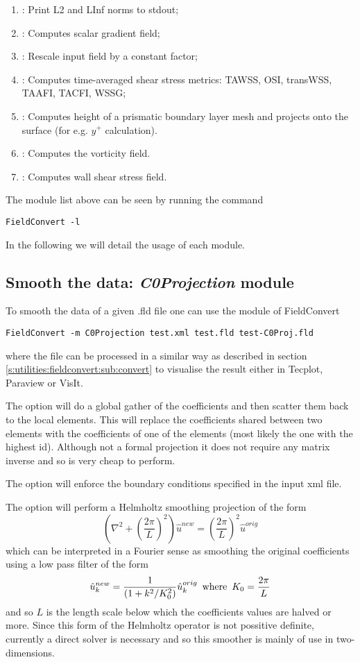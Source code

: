 \begin{enumerate}
\item {}: Print L2 and LInf norms to stdout;
\item {}: Computes scalar gradient field;
\item {}: Rescale input field by a constant factor;
\item {}: Computes time-averaged shear stress metrics: TAWSS, OSI, transWSS, TAAFI, TACFI, WSSG;
\item {}: Computes height of a prismatic boundary layer mesh and projects onto the surface (for e.g. $y^+$ calculation).
\item {}: Computes the vorticity field.
\item {}: Computes wall shear stress field.
\end{enumerate}
The module list above can be seen by running the command
%
\begin{lstlisting}[style=BashInputStyle]
FieldConvert -l
\end{lstlisting}
%
In the following we will detail the usage of each module.
%
%
%

\subsection{Smooth the data: \textit{C0Projection} module}
To smooth the data of a given .fld file one can
use the  module of FieldConvert
%
\begin{lstlisting}[style=BashInputStyle]
FieldConvert -m C0Projection test.xml test.fld test-C0Proj.fld
\end{lstlisting}
%
where the file  can be processed in a similar
way as described in section \ref{s:utilities:fieldconvert:sub:convert}
to visualise the result either in Tecplot, Paraview or VisIt.

The option  will do a global gather of the
coefficients and then scatter them back to the local elements. This
will replace the coefficients shared between two elements with the
coefficients of one of the elements (most likely the one with the
highest id). Although not a formal projection it does not require any
matrix inverse and so is very cheap to perform.

The option  will enforce the boundary conditions
specified in the input xml file.

The option  will perform a Helmholtz
smoothing projection of the form
\[
\left (\nabla^2 + \left (\frac{2 \pi}{L}\right )^2 \right ) \hat{u}^{new} =
\left (\frac{2 \pi}{L}\right )^2 \hat{u}^{orig}
\]
which can be interpreted in a Fourier sense as smoothing the original
coefficients using a low pass filter of the form
\[
\hat{u}_k^{new} = \frac{1}{(1 + k^2/K_0^2)} \hat{u}_k^{orig} \mbox{\,  where  \,}
K_0 = \frac{2 \pi}{L}
\]
and so $L$ is the length scale below which the coefficients values are
halved or more. Since this form of the Helmholtz operator is not
possitive definite, currently a direct solver is necessary and so this
smoother is mainly of use in two-dimensions.

